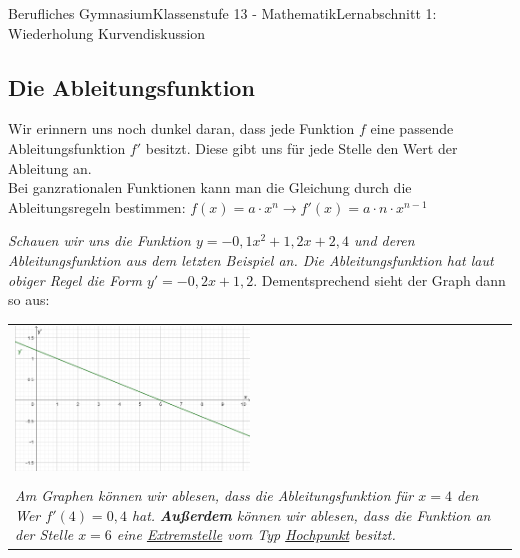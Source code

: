\documentclass[11pt,twocolumn,oneside,openany,headings=optiontotoc,11pt,numbers=noenddot]{article}
\begin{document}
\begin{worksheet}{Berufliches Gymnasium}{Klassenstufe 13 - Mathematik}{Lernabschnitt 1: Wiederholung Kurvendiskussion}
		\subsection{Die Ableitungsfunktion}
		Wir erinnern uns noch dunkel daran, dass jede Funktion \(f\) eine passende Ableitungsfunktion \(f'\) besitzt. Diese gibt uns für jede Stelle den Wert der Ableitung an.\\
		Bei ganzrationalen Funktionen kann man die Gleichung durch die Ableitungsregeln bestimmen: \(f(x) = a\cdot{}x^n\rightarrow{}f'(x) = a\cdot{}n\cdot{}x^{n-1}\)\\
		\par\bigskip\noindent
		\textit{Schauen wir uns die Funktion \(y = -0,1x^2 + 1,2x +2,4\) und deren Ableitungsfunktion aus dem letzten Beispiel an. Die Ableitungsfunktion hat laut obiger Regel die Form \(y' = -0,2x + 1,2\)}. Dementsprechend sieht der Graph dann so aus:\\
		\par\bigskip\noindent
		\begin{tabularx}{0.5\textwidth}{X}
			\includegraphics[width=0.48\textwidth]{../99_Bilder/KiTa'.png}\\
			\\
			\textit{Am Graphen können wir ablesen, dass die Ableitungsfunktion für \(x=4\) den Wer \(f'(4)=0,4\) hat.}
			\textit{\textbf{Außerdem} können wir ablesen, dass die Funktion an der Stelle \(x=6\) eine \underline{Extremstelle} vom Typ \underline{Hochpunkt} besitzt.}
		\end{tabularx}

\end{worksheet}
\end{document}
